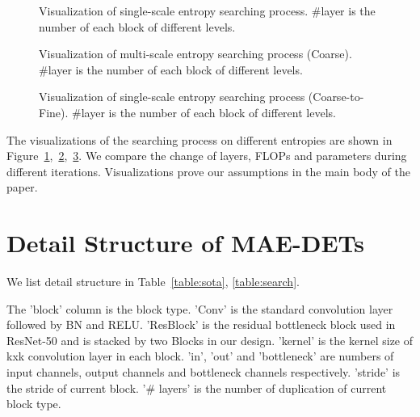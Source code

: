 \documentclass[nohyperref]{article}
\theoremstyle{plain}
\theoremstyle{definition}
\theoremstyle{remark}
\begin{document}
\begin{figure}[h]
	\centering
{}
\caption{Visualization of single-scale entropy searching process. \#layer is the number of each block of different levels.}
	\label{fig:sse}
\end{figure}
\begin{figure}[h]
	\centering
{}
\caption{Visualization of multi-scale entropy searching process (Coarse). \#layer is the number of each block of different levels.}
	\label{fig:mse-coarse}
\end{figure}
\begin{figure}[!h]
	\centering
{}
\caption{Visualization of single-scale entropy searching process (Coarse-to-Fine). \#layer is the number of each block of different levels.}
	\label{fig:mse-fine}
\end{figure}

The visualizations of the searching process on different entropies are shown in Figure~\ref{fig:sse},~\ref{fig:mse-coarse},~\ref{fig:mse-fine}. We compare the change of layers, FLOPs and parameters during different iterations. Visualizations prove our assumptions in the main body of the paper.

\section{Detail Structure of MAE-DETs}\label{app:struc}
We list detail structure in Table~\ref{table:sota}, \ref{table:search}.

The 'block' column is the block type. 'Conv' is the standard convolution layer followed by BN and RELU. 'ResBlock' is the residual bottleneck block used in ResNet-50 and is stacked by two Blocks in our design. 'kernel' is the kernel size of kxk convolution layer in each block. 'in', 'out' and 'bottleneck' are numbers of input channels, output channels and bottleneck channels respectively. 'stride' is the stride of current block. '\# layers' is the number of duplication of current block type.
\end{document}
